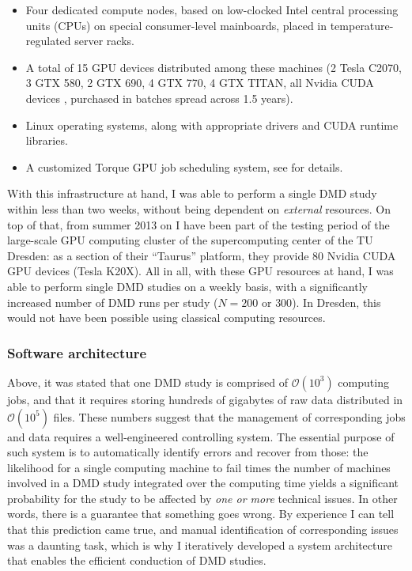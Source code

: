 \begin{itemize}
\item Four dedicated compute nodes, based on low-clocked Intel central
processing units (CPUs) on special consumer-level mainboards, placed in
temperature-regulated server racks.
\item A total of 15 GPU devices distributed among these machines (2 Tesla C2070,
3 GTX 580, 2 GTX 690, 4 GTX 770, 4 GTX TITAN, all Nvidia CUDA devices
\cite{nvidia_cuda_devices}, purchased in batches spread across 1.5 years).
\item Linux operating systems, along with appropriate drivers and CUDA runtime
libraries.
\item A customized Torque \cite{torque_website} GPU job scheduling system, see
\cite{gehrcke_torque_gpu_setup} for details.
\end{itemize}

With this infrastructure at hand, I was able to perform a single DMD study
within less than two weeks, without being dependent on \textit{external}
resources. On top of that, from summer 2013 on I have been part of the testing
period of the large-scale GPU computing cluster of the supercomputing center of
the TU Dresden: as a section of their \enquote{Taurus} platform, they provide 80
Nvidia CUDA GPU devices (Tesla K20X). All in all, with these GPU resources at
hand, I was able to perform single DMD studies on a weekly basis, with a
significantly increased number of DMD runs per study ($N=200$ or $300$). In
Dresden, this would not have been possible using classical computing resources.


\subsubsection{Software architecture}

Above, it was stated that one DMD study is comprised of $\mathcal{O}(10^3)$
computing jobs, and that it requires storing hundreds of gigabytes of raw data
distributed in $\mathcal{O}(10^5)$ files. These numbers suggest that the
management of corresponding jobs and data requires a well-engineered controlling
system. The essential purpose of such system is to automatically identify errors
and recover from those: the likelihood for a single computing machine to fail
times the number of machines involved in a DMD study integrated over the
computing time yields a significant probability for the study to be affected by
\textit{one or more} technical issues. In other words, there is a guarantee that
something goes wrong. By experience I can tell that this prediction came true,
and manual identification of corresponding issues was a daunting task, which is
why I iteratively developed a system architecture that enables the efficient
conduction of DMD studies.

